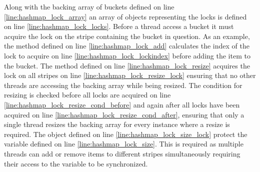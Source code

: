 Along with the backing array of buckets defined on line \ref{line:hashmap_lock_array} an array of objects representing the locks is defined on line \ref{line:hashmap_lock_locks}. Before a thread access a bucket it must acquire the lock on the stripe containing the bucket in question. As an example, the  method defined on line \ref{line:hashmap_lock_add} calculates the index of the lock to acquire on line \ref{line:hashmap_lock_lockindex} before adding the item to the bucket. The  method defined on line \ref{line:hashmap_lock_resize} acquires the lock on all stripes on line \ref{line:hashmap_lock_resize_lock} ensuring that no other threads are accessing the backing array while being resized. The condition for resizing is checked before all locks are acquired on line \ref{line:hashmap_lock_resize_cond_before} and again after all locks have been acquired on line \ref{line:hashmap_lock_resize_cond_after}, ensuring that only a single thread resizes the backing array for every instance where a resize is required. The object defined on line \ref{line:hashmap_lock_size_lock} protect the  variable defined on line \ref{line:hashmap_lock_size}. This is required as multiple threads can add or remove items to different stripes simultaneously requiring their access to the  variable to be synchronized.

